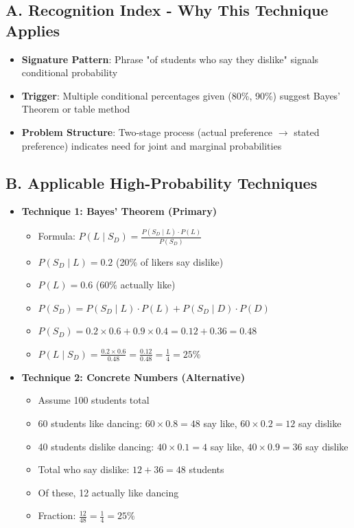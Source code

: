 \documentclass[]{article}
\begin{document}
\begin{techniquesbox}
\subsection*{A. Recognition Index - Why This Technique Applies}
\begin{itemize}[leftmargin=*]
    \item \textbf{Signature Pattern}: Phrase "of students who say they dislike" signals conditional probability
    
    \item \textbf{Trigger}: Multiple conditional percentages given (80\%, 90\%) suggest Bayes' Theorem or table method
    
    \item \textbf{Problem Structure}: Two-stage process (actual preference $\rightarrow$ stated preference) indicates need for joint and marginal probabilities
\end{itemize}

\subsection*{B. Applicable High-Probability Techniques}
\begin{itemize}[leftmargin=*]
    \item \textbf{Technique 1: Bayes' Theorem (Primary)}
    \begin{itemize}
        \item Formula: $P(L \mid S_D) = \frac{P(S_D \mid L) \cdot P(L)}{P(S_D)}$
        \item $P(S_D \mid L) = 0.2$ (20\% of likers say dislike)
        \item $P(L) = 0.6$ (60\% actually like)
        \item $P(S_D) = P(S_D \mid L) \cdot P(L) + P(S_D \mid D) \cdot P(D)$
        \item $P(S_D) = 0.2 \times 0.6 + 0.9 \times 0.4 = 0.12 + 0.36 = 0.48$
        \item $P(L \mid S_D) = \frac{0.2 \times 0.6}{0.48} = \frac{0.12}{0.48} = \frac{1}{4} = 25\%$
    \end{itemize}
    
    \item \textbf{Technique 2: Concrete Numbers (Alternative)}
    \begin{itemize}
        \item Assume 100 students total
        \item 60 students like dancing: $60 \times 0.8 = 48$ say like, $60 \times 0.2 = 12$ say dislike
        \item 40 students dislike dancing: $40 \times 0.1 = 4$ say like, $40 \times 0.9 = 36$ say dislike
        \item Total who say dislike: $12 + 36 = 48$ students
        \item Of these, 12 actually like dancing
        \item Fraction: $\frac{12}{48} = \frac{1}{4} = 25\%$
    \end{itemize}
\end{itemize}


\end{techniquesbox}
\end{document}
